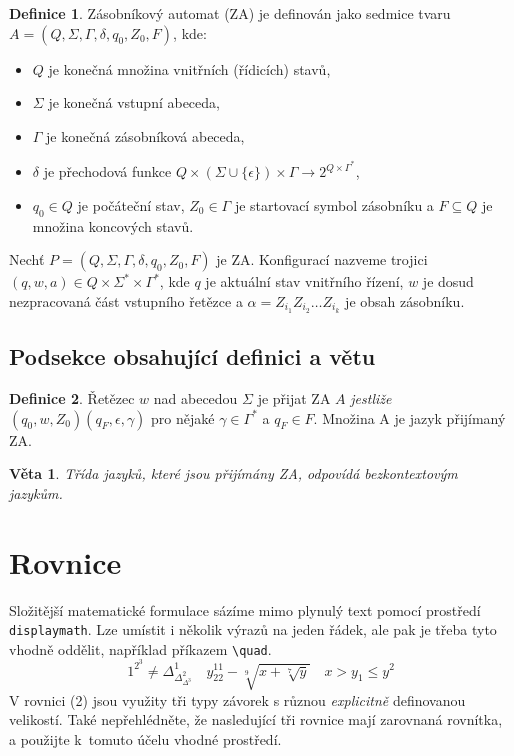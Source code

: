 \documentclass[twocolumn,11pt]{article}
\theoremstyle{definition}
\newtheorem{definition}{Definice}[section]
\theoremstyle{plain}
\newtheorem{theorem}{Věta}[section]
\begin{document}
\begin{definition}
Zásobníkový automat (ZA) je definován jako sedmice tvaru
$A = (Q, \Sigma, \Gamma, \delta, q_0, Z_0, F)$, kde:
\end{definition}
\begin{itemize}
    \item $Q$ je konečná množina vnitřních (řídicích) stavů,
    \item $\Sigma$ je konečná vstupní abeceda,
    \item $\Gamma$ je konečná zásobníková abeceda,
    \item $\delta$ je přechodová funkce $Q \times \left(\Sigma \cup \{ \epsilon \} \right) \times \Gamma \rightarrow 2^{Q \times \Gamma^*}$,
    \item $q_0 \in Q$ je počáteční stav, $Z_0 \in \Gamma$ je startovací symbol zásobníku a $F \subseteq Q$ je množina koncových stavů.
\end{itemize}

Nechť $P = \left(Q, \Sigma, \Gamma, \delta, q_0, Z_0, F\right)$ je ZA. Konfigurací nazveme trojici $(q, w, a) \in Q \times \Sigma^* \times \Gamma^*$, kde $q$ je aktuální stav vnitřního
řízení, $w$ je dosud nezpracovaná část vstupního řetězce a $\alpha = Z_{i_1} Z_{i_2} \dots Z_{i_k}$ je obsah zásobníku.

\subsection{Podsekce obsahující definici a větu}
\begin{definition}
Řetězec $w$ nad abecedou $\Sigma$ je přijat ZA $A$ \emph{jestliže} $\left(q_0, w, Z_0\right) (q_F, \epsilon, \gamma)$ pro nějaké $\gamma \in \Gamma^*$ a $q_F \in F$.
Množina A je jazyk přijímaný ZA.
\end{definition}
\begin{theorem}
Třída jazyků, které jsou přijímány ZA, odpovídá bezkontextovým jazykům.
\end{theorem}

\section{Rovnice}
Složitější matematické formulace sázíme mimo plynulý text pomocí prostředí \verb|displaymath|.
Lze umístit i několik výrazů na jeden řádek, ale pak je třeba tyto vhodně oddělit,
například příkazem \verb|\quad|.
$$
1^{2^3} \neq \Delta^1_{\Delta^2_{\Delta^3}} \quad
y^{11}_{22} - \sqrt[9]{x + \sqrt[7]{y}} \quad
x > y_1 \leq y^2
$$
V rovnici (2) jsou využity tři typy závorek s různou \emph{explicitně}
definovanou velikostí. Také nepřehlédněte, že nasledující tři rovnice mají zarovnaná
rovnítka, a použijte k~tomuto účelu vhodné prostředí.
\end{document}

